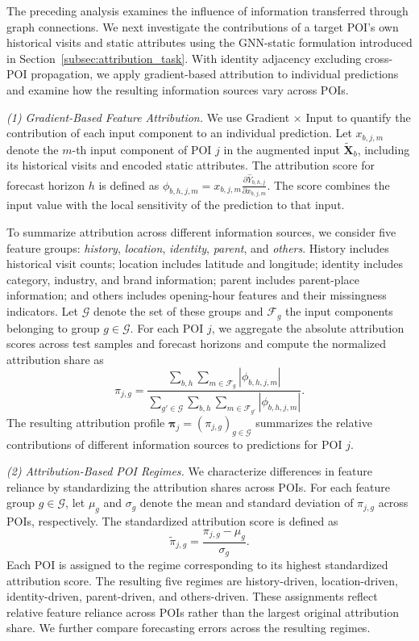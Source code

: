 \documentclass[preprint,authoryear,11pt]{elsarticle}
\theoremstyle{definition}
\begin{document}
The preceding analysis examines the influence of information transferred through graph connections.
We next investigate the contributions of a target POI's own historical visits and static attributes using the GNN-static formulation introduced in Section~\ref{subsec:attribution_task}.
With identity adjacency excluding cross-POI propagation, we apply gradient-based attribution to individual predictions and examine how the resulting information sources vary across POIs.

\textit{(1) Gradient-Based Feature Attribution.}
We use Gradient \(\times\) Input to quantify the contribution of each input component to an individual prediction.
Let \(x_{b,j,m}\) denote the \(m\)-th input component of POI \(j\) in the augmented input \(\widetilde{\mathbf{X}}_b\), including its historical visits and encoded static attributes.
The attribution score for forecast horizon \(h\) is defined as
\(\phi_{b,h,j,m}=x_{b,j,m}\frac{\partial\hat Y_{b,h,j}}{\partial x_{b,j,m}}\).
The score combines the input value with the local sensitivity of the prediction to that input.

To summarize attribution across different information sources, we consider five feature groups: \textit{history}, \textit{location}, \textit{identity}, \textit{parent}, and \textit{others}.
History includes historical visit counts; location includes latitude and longitude; identity includes category, industry, and brand information; parent includes parent-place information; and others includes opening-hour features and their missingness indicators.
Let \(\mathcal{G}\) denote the set of these groups and \(\mathcal{F}_g\) the input components belonging to group \(g\in\mathcal{G}\).
For each POI \(j\), we aggregate the absolute attribution scores across test samples and forecast horizons and compute the normalized attribution share as
\begin{equation}
\pi_{j,g}
=
\frac{
\sum_{b,h}
\sum_{m\in\mathcal{F}_g}
|\phi_{b,h,j,m}|
}{
\sum_{g'\in\mathcal{G}}
\sum_{b,h}
\sum_{m\in\mathcal{F}_{g'}}
|\phi_{b,h,j,m}|
}.
\label{eq:attribution_group_share}
\end{equation}
The resulting attribution profile
\(\boldsymbol{\pi}_j=(\pi_{j,g})_{g\in\mathcal{G}}\)
summarizes the relative contributions of different information sources to predictions for POI \(j\).

\textit{(2) Attribution-Based POI Regimes.}
We characterize differences in feature reliance by standardizing the attribution shares across POIs.
For each feature group \(g\in\mathcal{G}\), let \(\mu_g\) and \(\sigma_g\) denote the mean and standard deviation of \(\pi_{j,g}\) across POIs, respectively.
The standardized attribution score is defined as
\begin{equation}
\widetilde{\pi}_{j,g}
=
\frac{\pi_{j,g}-\mu_g}{\sigma_g}.
\end{equation}
Each POI is assigned to the regime corresponding to its highest standardized attribution score.
The resulting five regimes are history-driven, location-driven, identity-driven, parent-driven, and others-driven.
These assignments reflect relative feature reliance across POIs rather than the largest original attribution share.
We further compare forecasting errors across the resulting regimes.
\end{document}
